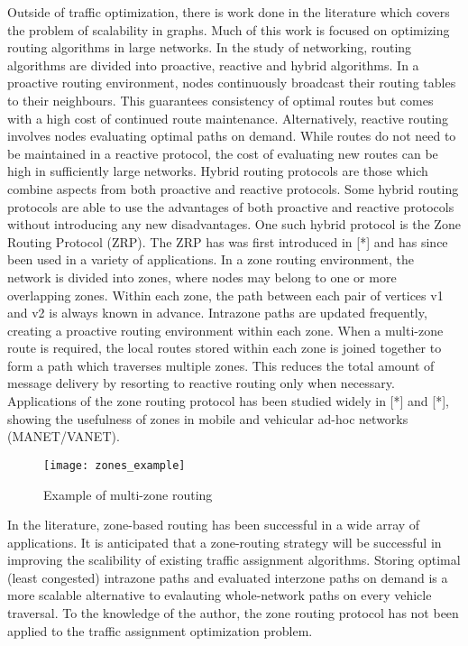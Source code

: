 \documentclass[conference]{IEEEtran}
\begin{document}
Outside of traffic optimization, there is work done in the literature which covers the problem of scalability in graphs. Much of this work is focused on optimizing routing algorithms in large networks. In the study of networking, routing algorithms are divided into proactive, reactive and hybrid algorithms. In a proactive routing environment, nodes continuously broadcast their routing tables to their neighbours. This guarantees consistency of optimal routes but comes with a high cost of continued route maintenance. Alternatively, reactive routing involves nodes evaluating optimal paths on demand. While routes do not need to be maintained in a reactive protocol, the cost of evaluating new routes can be high in sufficiently large networks. Hybrid routing protocols are those which combine aspects from both proactive and reactive protocols. Some hybrid routing protocols are able to use the advantages of both proactive and reactive protocols without introducing any new disadvantages. One such hybrid protocol is the Zone Routing Protocol (ZRP). The ZRP has was first introduced in [*] and has since been used in a variety of applications. In a zone routing environment, the network is divided into zones, where nodes may belong to one or more overlapping zones. Within each zone, the path between each pair of vertices v1 and v2 is always known in advance. Intrazone paths are updated frequently, creating a proactive routing environment within each zone. When a multi-zone route is required, the local routes stored within each zone is joined together to form a path which traverses multiple zones. This reduces the total amount of message delivery by resorting to reactive routing only when necessary. Applications of the zone routing protocol has been studied widely in [*] and [*], showing the usefulness of zones in mobile and vehicular ad-hoc networks (MANET/VANET). 

\begin{figure}[h]
\caption{Example of multi-zone routing}
\centering
\texttt{[image: zones\_example]}
\end{figure}

In the literature, zone-based routing has been successful in a wide array of applications. It is anticipated that a zone-routing strategy will be successful in improving the scalibility of existing traffic assignment algorithms. Storing optimal (least congested) intrazone paths and evaluated interzone paths on demand is a more scalable alternative to evalauting whole-network paths on every vehicle traversal. To the knowledge of the author, the zone routing protocol has not been applied to the traffic assignment optimization problem.
\end{document}
